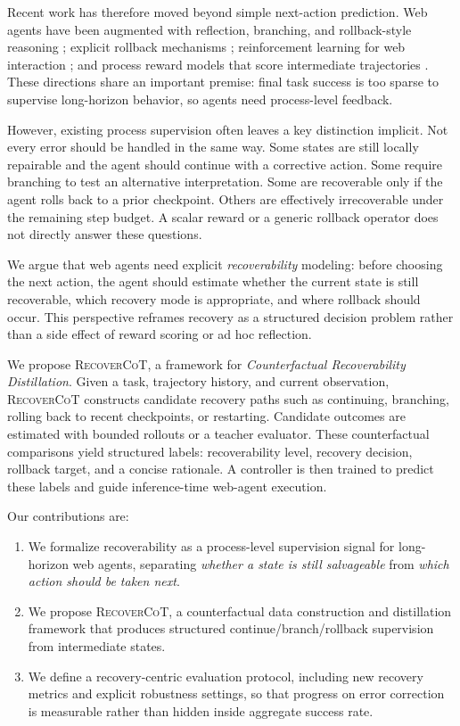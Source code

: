 \documentclass[11pt]{article}
\begin{document}
Recent work has therefore moved beyond simple next-action prediction. Web agents have been augmented with reflection, branching, and rollback-style reasoning \citep{hu-etal-2025-webcot}; explicit rollback mechanisms \citep{zhang-etal-2026-webrollback}; reinforcement learning for web interaction \citep{wei-etal-2025-webagentr1}; and process reward models that score intermediate trajectories \citep{choudhury2025agentprm,zhang2026webarbiter}. These directions share an important premise: final task success is too sparse to supervise long-horizon behavior, so agents need process-level feedback.

However, existing process supervision often leaves a key distinction implicit. Not every error should be handled in the same way. Some states are still locally repairable and the agent should continue with a corrective action. Some require branching to test an alternative interpretation. Some are recoverable only if the agent rolls back to a prior checkpoint. Others are effectively irrecoverable under the remaining step budget. A scalar reward or a generic rollback operator does not directly answer these questions.

We argue that web agents need explicit \textit{recoverability} modeling: before choosing the next action, the agent should estimate whether the current state is still recoverable, which recovery mode is appropriate, and where rollback should occur. This perspective reframes recovery as a structured decision problem rather than a side effect of reward scoring or ad hoc reflection.

We propose \textsc{RecoverCoT}, a framework for \textit{Counterfactual Recoverability Distillation}. Given a task, trajectory history, and current observation, \textsc{RecoverCoT} constructs candidate recovery paths such as continuing, branching, rolling back to recent checkpoints, or restarting. Candidate outcomes are estimated with bounded rollouts or a teacher evaluator. These counterfactual comparisons yield structured labels: recoverability level, recovery decision, rollback target, and a concise rationale. A controller is then trained to predict these labels and guide inference-time web-agent execution.

Our contributions are:
\begin{enumerate}[leftmargin=*]
    \item We formalize recoverability as a process-level supervision signal for long-horizon web agents, separating \emph{whether a state is still salvageable} from \emph{which action should be taken next}.
    \item We propose \textsc{RecoverCoT}, a counterfactual data construction and distillation framework that produces structured continue/branch/rollback supervision from intermediate states.
    \item We define a recovery-centric evaluation protocol, including new recovery metrics and explicit robustness settings, so that progress on error correction is measurable rather than hidden inside aggregate success rate.
\end{enumerate}
\end{document}
